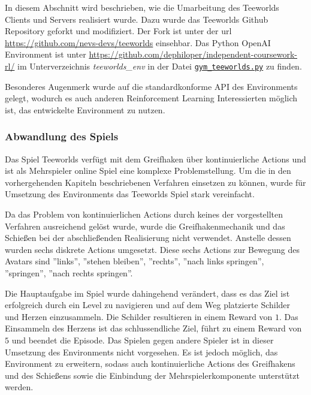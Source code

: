 \documentclass[11pt]{scrartcl}
\begin{document}
In diesem Abschnitt wird beschrieben, wie die Umarbeitung des Teeworlds Clients und
Servers realisiert wurde. Dazu wurde das Teeworlds Github Repository geforkt und
modifiziert. Der Fork ist unter der url \url{https://github.com/nevs-devs/teeworlds} einsehbar.
Das Python OpenAI Environment ist unter \url{https://github.com/dephiloper/independent-coursework-rl/}
im Unterverzeichnis \textit{teeworlds\_env} in der Datei
\href{https://github.com/dephiloper/independent-coursework-rl/blob/master/teeworlds_env/gym_teeworlds.py}
{\nolinkurl{gym\_teeworlds.py}} zu finden.

Besonderes Augenmerk wurde auf die standardkonforme API des Environments gelegt, wodurch
es auch anderen Reinforcement Learning Interessierten möglich ist, das entwickelte
Environment zu nutzen.

\subsubsection{Abwandlung des Spiels}
Das Spiel Teeworlds verfügt mit dem Greifhaken über kontinuierliche Actions und ist als
Mehrspieler online Spiel eine komplexe Problemstellung. Um die in den vorhergehenden
Kapiteln beschriebenen Verfahren einsetzen zu können, wurde für Umsetzung des Environments
das Teeworlds Spiel stark vereinfacht.

Da das Problem von kontinuierlichen Actions durch keines der vorgestellten Verfahren
ausreichend gelöst wurde, wurde die Greifhakenmechanik und das Schießen bei der
abschließenden Realisierung nicht verwendet. Anstelle dessen wurden sechs diskrete
Actions umgesetzt. Diese sechs Actions zur Bewegung des Avatars sind ''links'',
''stehen bleiben'', ''rechts'', ''nach links springen'', ''springen'',
''nach rechts springen''.

Die Hauptaufgabe im Spiel wurde dahingehend verändert, dass es das Ziel ist erfolgreich
durch ein Level zu navigieren und auf dem Weg platzierte Schilder und Herzen einzusammeln.
Die Schilder resultieren in einem Reward von $1$. Das Einsammeln des Herzens ist das
schlussendliche Ziel, führt zu einem Reward von $5$ und beendet die Episode. Das Spielen
gegen andere Spieler ist in dieser Umsetzung des Environments nicht vorgesehen. 
Es ist jedoch möglich, das Environment zu erweitern, sodass auch kontinuierliche Actions
des Greifhakens und des Schießens sowie die Einbindung der Mehrspielerkomponente
unterstützt werden.
\end{document}
